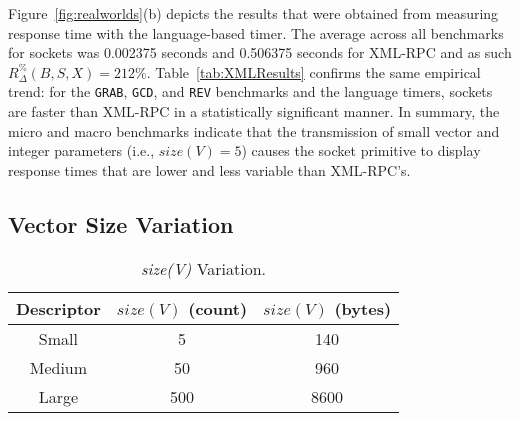\documentclass{sig-alternate}
\begin{document}



Figure~\ref{fig:realworlds}(b) depicts the results that were obtained
from measuring response time with the language-based timer. The
average across all benchmarks for sockets was 0.002375 seconds and
0.506375 seconds for XML-RPC and as such {\small
  $R_\Delta^\%(B,S,X)$}$=212\%$.  Table~\ref{tab:XMLResults} confirms
the same empirical trend: for the {\tt GRAB}, {\tt GCD}, and {\tt REV}
benchmarks and the language timers, sockets are faster than XML-RPC in
a statistically significant manner.  In summary, the micro and macro
benchmarks indicate that the transmission of small vector and integer
parameters (i.e., $size(V)=5$) causes the socket primitive to display
response times that are lower and less variable than XML-RPC's.

\subsection{Vector Size Variation}
\label{sec:variation}


\begin{table}[t]
  
  \begin{center}
  \begin{tabular}{| c | c | c |}
  \hline
  Descriptor & $size(V)$ (count) & $size(V)$ (bytes) \\
  \hline
  Small & 5 & 140 \\
  Medium & 50 & 960 \\
  Large & 500 & 8600 \\
  \hline
  \end{tabular}
\end{center}

  \vspace*{-.15in}
  \caption{{\em size(V)} Variation.}
  \label{tab:sizes}

\vspace*{-.2in}
\end{table}
\end{document}
